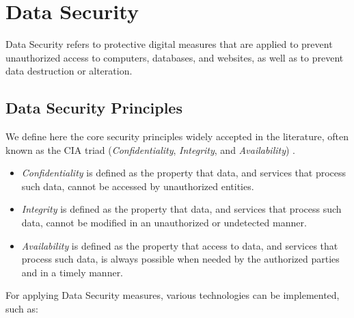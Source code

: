 
\section{Data Security} 
\label{sec:DataSecurity}


Data Security refers to protective digital measures that are applied to prevent unauthorized access to computers, databases, and websites, as well as to prevent data destruction or alteration.


\subsection{Data Security Principles}
\label{ssec:DataProtectionGoals}


We define here the core security principles widely accepted in the literature, often known as the CIA triad (\textit{Confidentiality}, \textit{Integrity}, and \textit{Availability}) \cite{Hansen2015}.

\begin{itemize}

    \item \textit{Confidentiality} is defined as the property that data, and services that process such data, cannot be accessed by unauthorized entities.

    \item \textit{Integrity} is defined as the property that data, and services that process such data, cannot be modified in an unauthorized or undetected manner.

    \item \textit{Availability} is defined as the property that access to data, and services that process such data, is always possible when needed by the authorized parties and in a timely manner.

\end{itemize}


For applying Data Security measures, various technologies can be implemented, such as:

